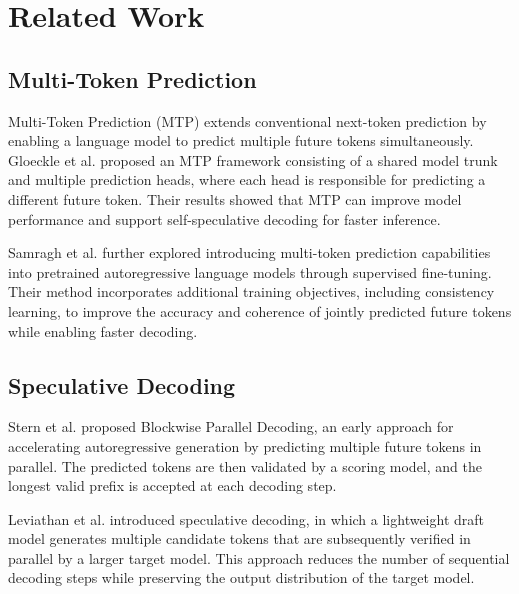 
\chapter{Related Work}\label{chap:related_works}

\section{Multi-Token Prediction}\label{sec:2-mtp}

Multi-Token Prediction (MTP) extends conventional next-token prediction by enabling a language model to predict multiple future tokens simultaneously. Gloeckle et al.\cite{gloeckle2024mtp} proposed an MTP framework consisting of a shared model trunk and multiple prediction heads, where each head is responsible for predicting a different future token. Their results showed that MTP can improve model performance and support self-speculative decoding for faster inference.

Samragh et al.\cite{samragh2025future} further explored introducing multi-token prediction capabilities into pretrained autoregressive language models through supervised fine-tuning. Their method incorporates additional training objectives, including consistency learning, to improve the accuracy and coherence of jointly predicted future tokens while enabling faster decoding.

\section{Speculative Decoding}\label{sec:2-speculative_decoding}

Stern et al.\cite{stern2018blockwise} proposed Blockwise Parallel Decoding, an early approach for accelerating autoregressive generation by predicting multiple future tokens in parallel. The predicted tokens are then validated by a scoring model, and the longest valid prefix is accepted at each decoding step.

Leviathan et al.\cite{leviathan2023speculative} introduced speculative decoding, in which a lightweight draft model generates multiple candidate tokens that are subsequently verified in parallel by a larger target model. This approach reduces the number of sequential decoding steps while preserving the output distribution of the target model.

